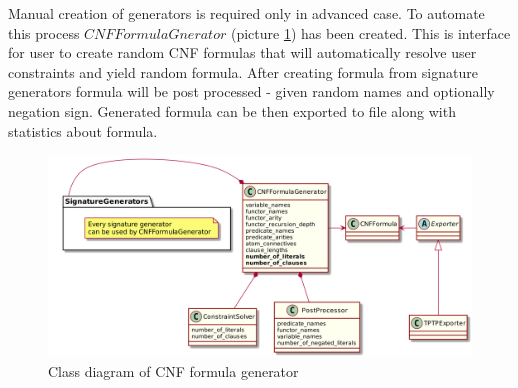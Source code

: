 Manual creation of generators is required only in advanced case. To automate this process $CNFFormulaGnerator$ (picture \ref{pic:cnf_generator_class_diagram}) has been created. This is interface for user to create random CNF formulas that will automatically resolve user constraints and yield random formula. After creating formula from signature generators formula will be post processed - given random names and optionally negation sign. Generated formula can be then exported to file along with statistics about formula.

\begin{figure}[h]
\begin{centering}
  \includegraphics[width=\textwidth]{logic-formula-generator/cnf_formula_generator.png}
  \caption{Class diagram of CNF formula generator}
  \label{pic:cnf_generator_class_diagram}
\end{centering}
\end{figure}

